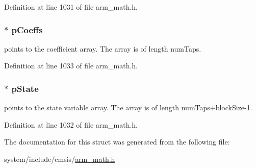 Definition at line 1031 of file arm\+\_\+math.\+h.

\subsubsection[{\texorpdfstring{p\+Coeffs}{pCoeffs}}]{$\ast$ p\+Coeffs}\hypertarget{structarm__fir__instance__q7_a54407554b4fe7bbbb43924e4eea45e7f}{}\label{structarm__fir__instance__q7_a54407554b4fe7bbbb43924e4eea45e7f}
points to the coefficient array. The array is of length num\+Taps. 

Definition at line 1033 of file arm\+\_\+math.\+h.

\subsubsection[{\texorpdfstring{p\+State}{pState}}]{$\ast$ p\+State}\hypertarget{structarm__fir__instance__q7_aa8f67102521b620af6f259afdcf29785}{}\label{structarm__fir__instance__q7_aa8f67102521b620af6f259afdcf29785}
points to the state variable array. The array is of length num\+Taps+block\+Size-\/1. 

Definition at line 1032 of file arm\+\_\+math.\+h.



The documentation for this struct was generated from the following file\+:\begin{DoxyCompactItemize}
\item 
system/include/cmsis/\hyperlink{arm__math_8h}{arm\+\_\+math.\+h}\end{DoxyCompactItemize}
